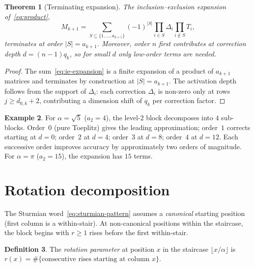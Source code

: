 \documentclass[11pt]{article}
\newtheorem{theorem}{Theorem}[section]
\theoremstyle{definition}
\newtheorem{definition}[theorem]{Definition}
\newtheorem{example}[theorem]{Example}
\theoremstyle{remark}
\newcommand{\floor}[1]{\lfloor #1 \rfloor}
\begin{document}
\begin{theorem}[Terminating expansion]\label{thm:ie}
The inclusion--exclusion expansion of~\eqref{eq:product},
\begin{equation}\label{eq:ie-expansion}
  M_{k+1} = \sum_{S \subseteq \{1, \ldots, a_{k+1}\}}
  (-1)^{|S|} \prod_{i \in S} \Delta_i \prod_{i \notin S} T_i,
\end{equation}
terminates at order $|S| = a_{k+1}$.
Moreover, order $n$ first contributes at correction depth
$d = (n-1)q_k$, so for small $d$ only low-order terms are
needed.
\end{theorem}

\begin{proof}
The sum~\eqref{eq:ie-expansion} is a finite expansion of a product
of $a_{k+1}$ matrices and terminates by construction at
$|S| = a_{k+1}$.
The activation depth follows from the support of $\Delta_i$:
each correction $\Delta_i$ is non-zero only at rows
$j \geq d_{0,k} + 2$, contributing a dimension shift of $q_k$
per correction factor.
\end{proof}

\begin{example}
For $\alpha = \sqrt{5}$ ($a_2 = 4$), the level-$2$ block decomposes
into $4$ sub-blocks.
Order~$0$ (pure Toeplitz) gives the leading approximation;
order~$1$ corrects starting at $d = 0$;
order~$2$ at $d = 4$; order~$3$ at $d = 8$; order~$4$ at $d = 12$.
Each successive order improves accuracy by approximately two orders
of magnitude.
For $\alpha = \pi$ ($a_2 = 15$), the expansion has $15$ terms.
\end{example}

\section{Rotation decomposition}\label{sec:rotation}

The Sturmian word~\eqref{eq:sturmian-pattern} assumes a
\emph{canonical} starting position (first column is a within-stair).
At non-canonical positions within the staircase, the block begins
with $r \geq 1$ rises before the first within-stair.

\begin{definition}
The \emph{rotation parameter} at position $x$ in the staircase
$\floor{x/\alpha}$ is
$r(x) = \#\{\text{consecutive rises starting at column } x\}$.
\end{definition}
\end{document}

